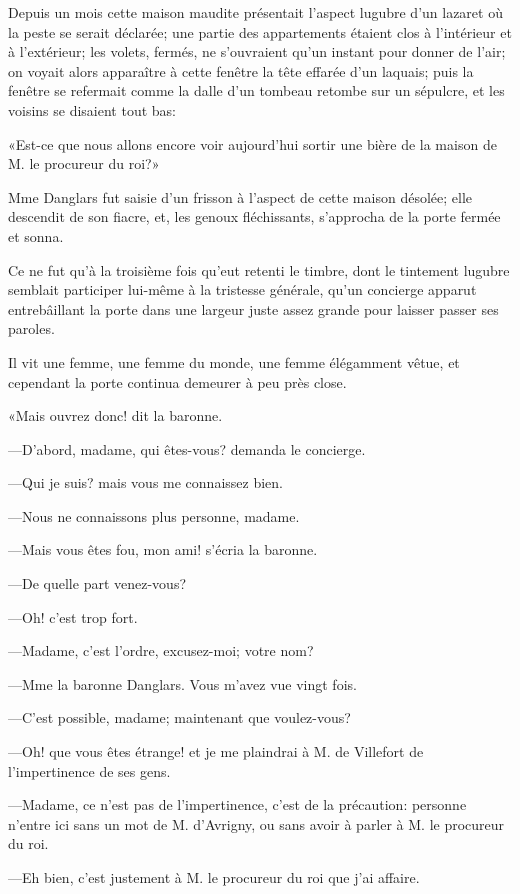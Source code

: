 Depuis un mois cette maison maudite présentait l'aspect lugubre d'un lazaret où la peste se serait déclarée; une partie des appartements étaient clos à l'intérieur et à l'extérieur; les volets, fermés, ne s'ouvraient qu'un instant pour donner de l'air; on voyait alors apparaître à cette fenêtre la tête effarée d'un laquais; puis la fenêtre se refermait comme la dalle d'un tombeau retombe sur un sépulcre, et les voisins se disaient tout bas: 

«Est-ce que nous allons encore voir aujourd'hui sortir une bière de la maison de M. le procureur du roi?» 

Mme Danglars fut saisie d'un frisson à l'aspect de cette maison désolée; elle descendit de son fiacre, et, les genoux fléchissants, s'approcha de la porte fermée et sonna. 

Ce ne fut qu'à la troisième fois qu'eut retenti le timbre, dont le tintement lugubre semblait participer lui-même à la tristesse générale, qu'un concierge apparut entrebâillant la porte dans une largeur juste assez grande pour laisser passer ses paroles. 

Il vit une femme, une femme du monde, une femme élégamment vêtue, et cependant la porte continua demeurer à peu près close. 

«Mais ouvrez donc! dit la baronne. 

—D'abord, madame, qui êtes-vous? demanda le concierge. 

—Qui je suis? mais vous me connaissez bien. 

—Nous ne connaissons plus personne, madame. 

—Mais vous êtes fou, mon ami! s'écria la baronne. 

—De quelle part venez-vous? 

—Oh! c'est trop fort. 

—Madame, c'est l'ordre, excusez-moi; votre nom? 

—Mme la baronne Danglars. Vous m'avez vue vingt fois. 

—C'est possible, madame; maintenant que voulez-vous? 

—Oh! que vous êtes étrange! et je me plaindrai à M. de Villefort de l'impertinence de ses gens. 

—Madame, ce n'est pas de l'impertinence, c'est de la précaution: personne n'entre ici sans un mot de M. d'Avrigny, ou sans avoir à parler à M. le procureur du roi. 

—Eh bien, c'est justement à M. le procureur du roi que j'ai affaire. 

